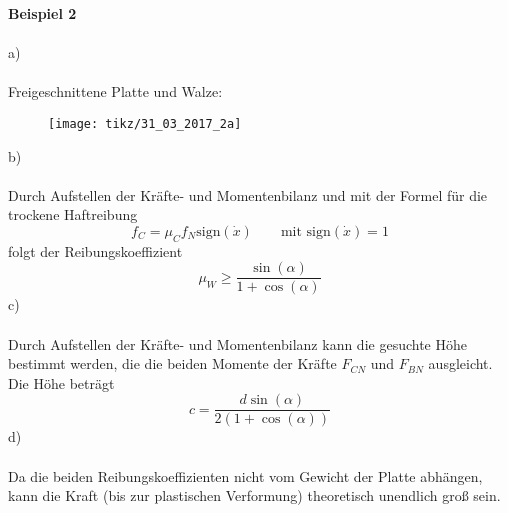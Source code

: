 \newpage
\noindent
\textbf{Beispiel 2}\\ \\
a)\\ \\
Freigeschnittene Platte und Walze:
\begin{figure}[h]
	\centering
	\texttt{[image: tikz/31\_03\_2017\_2a]}
\end{figure}
\newline
b)\\ \\
Durch Aufstellen der Kräfte- und Momentenbilanz und mit der Formel für die trockene Haftreibung
\[
	f_C = \mu_Cf_N\text{sign}(\dot{x}) \qquad \text{mit sign}(\dot{x}) = 1
\]
folgt der Reibungskoeffizient
\[
	\mu_W \geq \frac{\sin(\alpha)}{1 + \cos(\alpha)}
\]
c)\\ \\
Durch Aufstellen der Kräfte- und Momentenbilanz  kann die gesuchte Höhe bestimmt werden, die die beiden Momente der Kräfte $F_{CN}$ und $F_{BN}$ ausgleicht. Die Höhe beträgt
\[
	c = \frac{d\sin(\alpha)}{2(1 + \cos(\alpha))}
\]
d)\\ \\
Da die beiden Reibungskoeffizienten nicht vom Gewicht der Platte abhängen, kann die Kraft (bis zur plastischen Verformung) theoretisch unendlich groß sein.